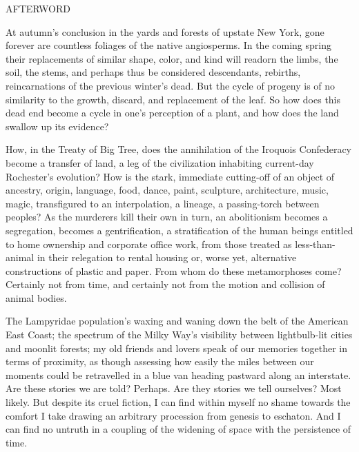 \documentclass[12pt]{article}
\begin{document}
\vspace*{8\baselineskip}

\begingroup
\begin{center}
\huge AFTERWORD
\end{center}
\endgroup

\begingroup
\hspace{5mm} At autumn's conclusion in the yards and forests of upstate New York, gone forever are countless foliages of the native angiosperms. In the coming spring their replacements of similar shape, color, and kind will readorn the limbs, the soil, the stems, and perhaps thus be considered descendants, rebirths, reincarnations of the previous winter's dead. But the cycle of progeny is of no similarity to the growth, discard, and replacement of the leaf. So how does this dead end become a cycle in one's perception of a plant, and how does the land swallow up its evidence? \\
\endgroup

\begingroup
\hspace{5mm} How, in the Treaty of Big Tree, does the annihilation of the Iroquois Confederacy become a transfer of land, a leg of the civilization inhabiting current-day Rochester's evolution? How is the stark, immediate cutting-off of an object of ancestry, origin, language, food, dance, paint, sculpture, architecture, music, magic, transfigured to an interpolation, a lineage, a passing-torch between peoples? As the murderers kill their own in turn, an abolitionism becomes a segregation, becomes a gentrification, a stratification of the human beings entitled to home ownership and corporate office work, from those treated as less-than-animal in their relegation to rental housing or, worse yet, alternative constructions of plastic and paper. From whom do these metamorphoses come? Certainly not from time, and certainly not from the motion and collision of animal bodies. \\
\endgroup

\begingroup
\hspace{5mm} The Lampyridae population's waxing and waning down the belt of the American East Coast; the spectrum of the Milky Way's visibility between lightbulb-lit cities and moonlit forests; my old friends and lovers speak of our memories together in terms of proximity, as though assessing how easily the miles between our moments could be retravelled in a blue van heading pastward along an interstate. Are these stories we are told? Perhaps. Are they stories we tell ourselves? Most likely. But despite its cruel fiction, I can find within myself no shame towards the comfort I take drawing an arbitrary procession from genesis to eschaton. And I can find no untruth in a coupling of the widening of space with the persistence of time. \\
\endgroup
\end{document}

